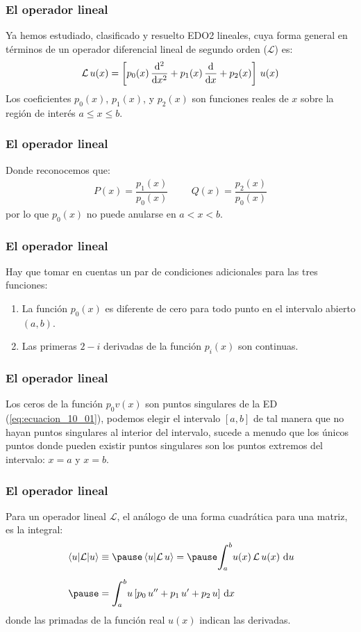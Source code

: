 \documentclass[12pt]{beamer}
\begin{document}
\begin{frame}
\frametitle{El operador lineal}
Ya hemos estudiado, clasificado y resuelto EDO2 lineales, cuya forma general en términos de un operador diferencial lineal de segundo orden ($\mathcal{L}$) es:
\pause
{\fontsize{12}{12}\selectfont
\begin{align}
\mathcal{L} \, u (x) = \left[ p_{0} (x) \, \dv[2]{x} + p_{1} (x) \, \dv{x} + p_{2} (x) \right] \, u (x)
\label{eq:ecuacion_10_01}
\end{align}}
Los coeficientes $p_{0} (x)$, $p_{1} (x)$, y $p_{2} (x)$ son funciones reales de $x$ sobre la región de interés $a \leq x \leq b$.
\end{frame}
\begin{frame}
\frametitle{El operador lineal}
Donde reconocemos que:
\pause
\begin{align*}
P (x) = \dfrac{p_{1} (x)}{p_{0}(x)} \hspace{1cm} Q (x) = \dfrac{p_{2} (x)}{p_{0} (x)}
\end{align*}
\pause
por lo que $p_{0} (x)$ no puede anularse en $a < x < b$.
\end{frame}
\begin{frame}
\frametitle{El operador lineal}
Hay que tomar en cuentas un par de condiciones adicionales para las tres funciones:
\pause
{}
\begin{enumerate}[<+->]
\item La función $p_{0} (x)$ es diferente de cero para todo punto en el intervalo abierto $(a, b)$.
\item Las primeras $2-i$ derivadas de la función $p_{i} (x)$ son continuas.
\end{enumerate}
\end{frame}
\begin{frame}
\frametitle{El operador lineal}
Los ceros de la función $p_{0} v (x)$ son puntos singulares de la ED (\ref{eq:ecuacion_10_01}), \pause podemos elegir el intervalo $[a, b]$ de tal manera que no hayan puntos singulares al interior del intervalo, \pause sucede a menudo que los únicos puntos donde pueden existir puntos singulares son los puntos extremos del intervalo: $x = a$ y $x = b$.
\end{frame}
\begin{frame}
\frametitle{El operador lineal}
Para un operador lineal $\mathcal{L}$, el análogo de una forma cuadrática para una matriz, es la integral:
\pause
\begin{eqnarray}
\begin{aligned}[b]
\matrixel{u}{\mathcal{L}}{u} &\equiv \pause \ip{u}{\mathcal{L} \, u} = \pause \scaleint{6ex}_{\bs a}^{b} u (x) \, \mathcal{L} \, u (x) \, \dd{u} \\[0.5em] \pause
&= \scaleint{6ex}_{\bs a}^{b} u \, [ p_{0} \, \sderivada{u} + p_{1} \, \pderivada{u} + p_{2} \, u ] \, \dd{x}
\end{aligned}
\label{eq:ecuacion_10_02}
\end{eqnarray}
donde las primadas de la función real $ u (x)$ indican las derivadas.
\end{frame}
\end{document}
